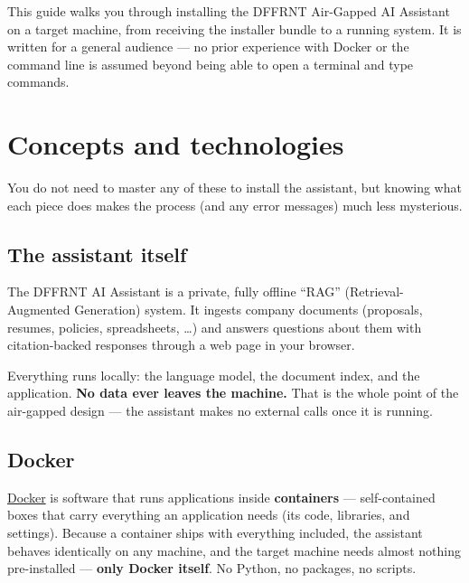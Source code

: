 \documentclass[11pt,letterpaper]{article}
\let\oldsection\section
\renewcommand{\section}{\vspace{1em}\oldsection}
\begin{document}
\setcounter{page}{1}
\pagestyle{fancy}

{\hypersetup{linkcolor=ink}\tableofcontents}
\clearpage

\setcounter{page}{1}

This guide walks you through installing the DFFRNT Air-Gapped AI Assistant on
a target machine, from receiving the installer bundle to a running system. It
is written for a general audience --- no prior experience with Docker or the
command line is assumed beyond being able to open a terminal and type
commands.

\section{Concepts and technologies}

You do not need to master any of these to install the assistant, but knowing
what each piece does makes the process (and any error messages) much less
mysterious.

\subsection{The assistant itself}

The DFFRNT AI Assistant is a private, fully offline ``RAG''
(Retrieval-Augmented Generation) system. It ingests company documents
(proposals, resumes, policies, spreadsheets, \ldots) and answers questions
about them with citation-backed responses through a web page in your browser.

\begin{gnote}
Everything runs locally: the language model, the document index, and the
application. \textbf{No data ever leaves the machine.} That is the whole point
of the air-gapped design --- the assistant makes no external calls once it is
running.
\end{gnote}

\subsection{Docker}

\href{https://www.docker.com/}{Docker} is software that runs applications
inside \textbf{containers} --- self-contained boxes that carry everything an
application needs (its code, libraries, and settings). Because a container
ships with everything included, the assistant behaves identically on any
machine, and the target machine needs almost nothing pre-installed ---
\textbf{only Docker itself}. No Python, no packages, no scripts.
\end{document}
